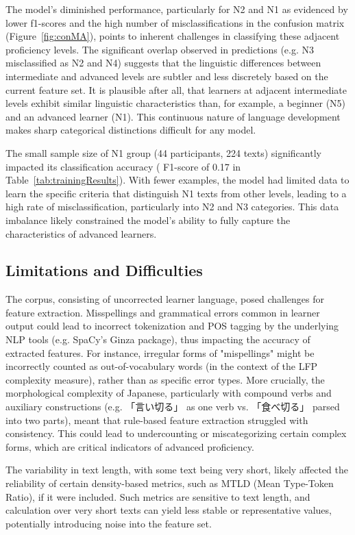 The model's diminished performance, particularly for N2 and N1 as evidenced by lower f1-scores and the high number
of misclassifications in the confusion matrix (Figure~\ref{fig:conMA}), points to inherent challenges in
classifying these adjacent proficiency levels. The significant overlap observed in predictions (e.g. N3 misclassified
as N2 and N4) suggests that the linguistic differences between intermediate and advanced levels are subtler and less
discretely based on the current feature set. It is plausible after all, that learners at adjacent intermediate
levels exhibit similar linguistic characteristics than, for example, a beginner (N5) and an advanced learner (N1).
This continuous nature of language development makes sharp categorical distinctions difficult for any model.

The small sample size of N1 group (44 participants, 224 texts) significantly impacted its classification accuracy (
F1-score
of 0.17 in Table~\ref{tab:trainingResults}). With fewer examples, the model had limited data to learn the specific
criteria that distinguish N1 texts from other levels, leading to a high rate of misclassification, particularly into
N2 and N3 categories. This data imbalance likely constrained the model's ability to fully capture the
characteristics of advanced learners.


\subsection{Limitations and Difficulties}
The corpus, consisting of uncorrected learner language, posed challenges for feature extraction. Misspellings and
grammatical errors common in learner output could lead to incorrect tokenization and POS tagging by the underlying
NLP tools (e.g. SpaCy's Ginza package), thus impacting the accuracy of extracted features. For instance, irregular
forms of "mispellings" might be incorrectly counted as out-of-vocabulary words (in the context of the LFP complexity
measure), rather than as specific error types. More crucially, the morphological complexity of Japanese,
particularly with compound verbs and auxiliary constructions (e.g. 「言い切る」 as one verb vs. 「食べ切る」 parsed into two
parts), meant that rule-based feature extraction struggled with consistency. This could lead to undercounting or
miscategorizing certain complex forms, which are critical indicators of advanced proficiency.

The variability in text length, with some text being very short, likely affected the reliability of certain
density-based metrics, such as MTLD (Mean Type-Token Ratio), if it were included. Such metrics are sensitive to text
length, and calculation over very short texts can yield less stable or representative values, potentially
introducing noise into the feature set.

